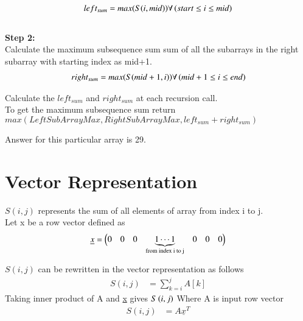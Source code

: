 \documentclass[journal,12pt,twocolumn]{IEEEtran}
\begin{document}
\begin{align}
    left_{sum} = max(S(i,mid)) \forall \left(start \le i \le mid \right)    
\end{align}\\

\textbf{Step 2:}\\
Calculate the maximum subsequence sum sum of all the subarrays in the right subarray with starting index as mid+1.
\begin{align}
    right_{sum} = max(S(mid+1,i))  \forall \left(mid+1 \le i \le end \right)
\end{align}

Calculate the $left_{sum}$ and $right_{sum}$ at each recursion call.\\
To get the maximum subsequence sum return $max(LeftSubArrayMax,RightSubArrayMax,left_{sum}+right_{sum})$ 

\begin{figure}[!ht]
    \begin{center}
		\resizebox{\columnwidth}{!}{}
	\end{center}
\caption{}
\label{fig:ee18btech11035_block}
\end{figure}

Answer for this particular array is 29.

\section{Vector Representation}

$S(i,j)$ represents the sum of all elements of array from index i to j.\\

Let x be a row vector defined as \\
\newcommand{\block}[1]{
  \underbrace{1 \cdots 1}_{#1}
}
\begin{align}
    \underline{x} = 
    \begin{pmatrix}
    0 & 0 & 0 & \smash[b]{\block{\text{from index i to j}}} & 0 & 0 & 0
    \end{pmatrix}
\end{align}\\

$S(i,j)$ can be rewritten in the vector representation as follows 
\begin{align}
     S(i,j) &=  \sum_{k=i}^{j} A[k]
\end{align}
Taking inner product of A and \underline{x} gives $S\left(i,j\right)$  Where A is input row vector
\begin{align}
     S(i,j) &= A\underline{x}^{T}
\end{align}
\end{document}
